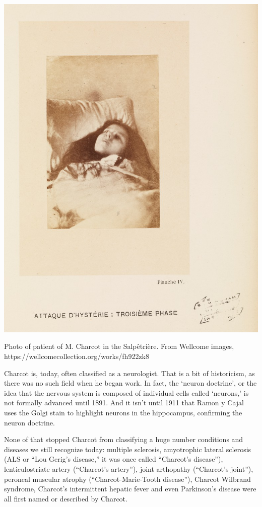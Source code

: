 \begin{refsection}
\begin{marginfigure}
 \begin{center}

     \includegraphics[scale=0.25]{../images/hysterie-troisiemephase.jpg}
\end{center}
 \caption{Photo of patient of M. Charcot in the Salpêtrière. From Wellcome images, https://wellcomecollection.org/works/fh922zk8 }
\label{fig: charcotpatient}
\end{marginfigure}


Charcot is, today, often classified as a neurologist. That is a bit of historicism, as there was no such field when he began work. In fact, the `neuron doctrine', or the idea that the nervous system is composed of individual cells called `neurons,' is not formally advanced until 1891. And it isn't until 1911 that Ramon y Cajal uses the Golgi stain to highlight neurons in the hippocampus, confirming the neuron doctrine.

None of that stopped Charcot from classifying a huge number conditions and diseases we still recognize today: multiple sclerosis, amyotrophic lateral sclerosis (ALS or “Lou Gerig's disease,” it was once called “Charcot's disease”), lenticulostriate artery (“Charcot's artery”), joint arthopathy (“Charcot's joint”), peroneal muscular atrophy (“Charcot-Marie-Tooth disease”), Charcot Wilbrand syndrome, Charcot's intermittent hepatic fever and even Parkinson's disease were all first named or described by Charcot.


\end{refsection}
